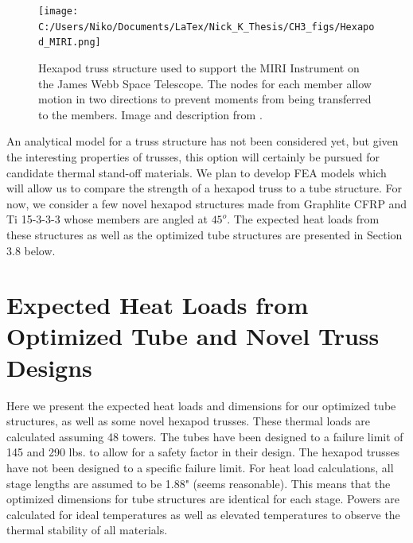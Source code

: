 \documentclass{report}
\begin{document}
\begin{figure}[ht]
\centering
\texttt{[image: C:/Users/Niko/Documents/LaTex/Nick\_K\_Thesis/CH3\_figs/Hexapod\_MIRI.png]}
\caption{Hexapod truss structure used to support the MIRI Instrument on the James Webb Space Telescope. The nodes for each member allow motion in two directions to prevent moments from being transferred to the members. Image and description from \cite{Jessen2004}.}
\end{figure}

An analytical model for a truss structure has not been considered yet, but given the interesting properties of trusses, this option will certainly be pursued for candidate thermal stand-off materials. We plan to develop FEA models which will allow us to compare the strength of a hexapod truss to a tube structure. For now, we consider a few novel hexapod structures made from Graphlite CFRP and Ti 15-3-3-3 whose members are angled at $45^{o}$. The expected heat loads from these structures as well as the optimized tube structures are presented in Section 3.8 below.

\section{Expected Heat Loads from Optimized Tube and Novel Truss Designs}

Here we present the expected heat loads and dimensions for our optimized tube structures, as well as some novel hexapod trusses. These thermal loads are calculated assuming 48 towers. The tubes have been designed to a failure limit of 145 and 290 lbs. to allow for a safety factor in their design. The hexapod trusses have not been designed to a specific failure limit. For heat load calculations, all stage lengths are assumed to be 1.88" (seems reasonable). This means that the optimized dimensions for tube structures are identical for each stage. Powers are calculated for ideal temperatures as well as elevated temperatures to observe the thermal stability of all materials.
\end{document}
